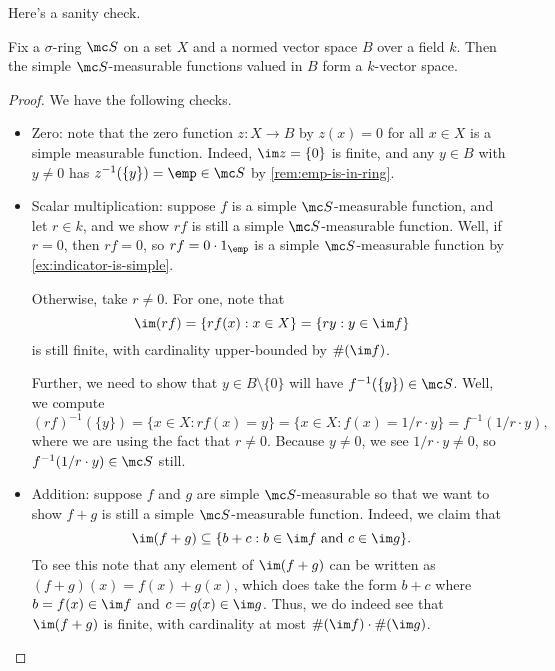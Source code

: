 \documentclass[../notes.tex]{subfiles}
\begin{document}
Here's a sanity check.
\begin{lemma} \label{lem:simple-meas-is-k-vec}
	Fix a $\sigma$-ring $\mc S$ on a set $X$ and a normed vector space $B$ over a field $k$. Then the simple $\mc S$-measurable functions valued in $B$ form a $k$-vector space.
\end{lemma}
\begin{proof}
	We have the following checks.
	\begin{itemize}
		\item Zero: note that the zero function $z\colon X\to B$ by $z(x)=0$ for all $x\in X$ is a simple measurable function. Indeed, $\im z=\{0\}$ is finite, and any $y\in B$ with $y\ne0$ has $z^{-1}(\{y\})=\emp\in\mc S$ by \autoref{rem:emp-is-in-ring}.

		\item Scalar multiplication: suppose $f$ is a simple $\mc S$-measurable function, and let $r\in k$, and we show $rf$ is still a simple $\mc S$-measurable function. Well, if $r=0$, then $rf=0$, so $rf=0\cdot1_{\emp}$ is a simple $\mc S$-measurable function by \autoref{ex:indicator-is-simple}.
		
		Otherwise, take $r\ne0$. For one, note that
		\[\im(rf)=\{rf(x):x\in X\}=\{ry:y\in\im f\}\]
		is still finite, with cardinality upper-bounded by $\#(\im f)$.

		Further, we need to show that $y\in B\setminus\{0\}$ will have $f^{-1}(\{y\})\in\mc S$. Well, we compute
		\[(rf)^{-1}(\{y\})=\{x\in X:rf(x)=y\}=\{x\in X:f(x)=1/r\cdot y\}=f^{-1}(1/r\cdot y),\]
		where we are using the fact that $r\ne0$. Because $y\ne0$, we see $1/r\cdot y\ne0$, so $f^{-1}(1/r\cdot y)\in\mc S$ still.

		\item Addition: suppose $f$ and $g$ are simple $\mc S$-measurable so that we want to show $f+g$ is still a simple $\mc S$-measurable function. Indeed, we claim that
		\[\im(f+g)\subseteq\{b+c:b\in\im f\text{ and }c\in\im g\}.\]
		To see this note that any element of $\im(f+g)$ can be written as $(f+g)(x)=f(x)+g(x)$, which does take the form $b+c$ where $b=f(x)\in\im f$ and $c=g(x)\in\im g$. Thus, we do indeed see that $\im(f+g)$ is finite, with cardinality at most $\#(\im f)\cdot\#(\im g)$.


\end{itemize}
\end{proof}
\end{document}
